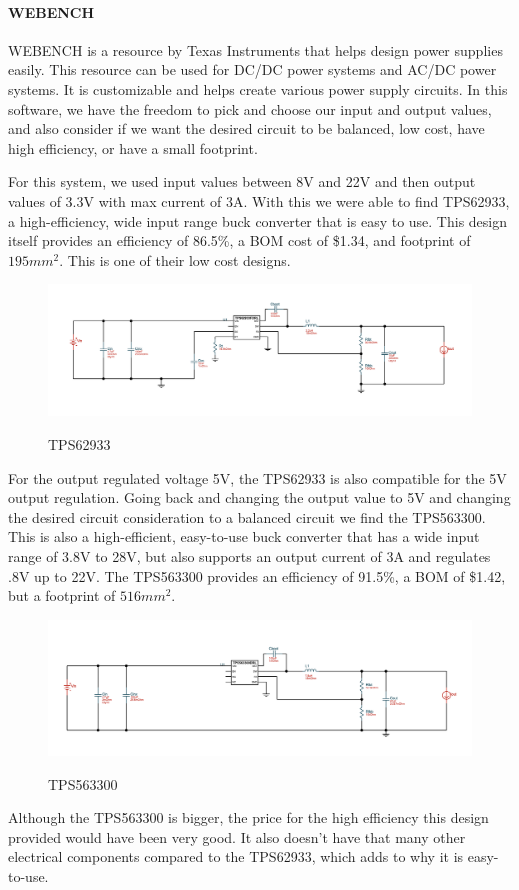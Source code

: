 \paragraph{WEBENCH}
 WEBENCH is a resource by Texas Instruments that helps design power supplies easily. This resource can be used for DC/DC power systems and AC/DC power systems. It is customizable and helps create various power supply circuits. In this software, we have the freedom to pick and choose our input and output values, and also consider if we want the desired circuit to be balanced, low cost, have high efficiency, or have a small footprint. \par
 For this system, we used input values between 8V and 22V and then output values of 3.3V with max current of 3A. With this we were able to find TPS62933, a high-efficiency, wide input range buck converter that is easy to use. This design itself provides an efficiency of 86.5\%, a BOM cost of \$1.34, and footprint of $195mm^2$. This is one of their low cost designs.\par
 \begin{figure}[H]
    \centering
    \caption{TPS62933}
    \includegraphics[width=\textwidth]{images/TPS62933.png}
    \label{fig:WEBENCH Design TPS62933}
\end{figure}
For the output regulated voltage 5V, the TPS62933 is also compatible for the 5V output regulation. Going back and changing the output value to 5V and changing the desired circuit consideration to a balanced circuit we find the TPS563300. This is also a high-efficient, easy-to-use buck converter that has a wide input range of 3.8V to 28V, but also supports an output current of 3A and regulates .8V up to 22V. The TPS563300 provides an efficiency of 91.5\%, a BOM of \$1.42, but a footprint of $516mm^2$. \par
\begin{figure}[H]
    \centering
    \caption{TPS563300}
    \includegraphics[width=\textwidth]{images/TPS563300.png}
    \label{fig:WEBENCH Design TPS563300}
\end{figure}
Although the TPS563300 is bigger, the price for the high efficiency this design provided would have been very good. It also doesn’t have that many other electrical components compared to the TPS62933, which adds to why it is easy-to-use.\par
